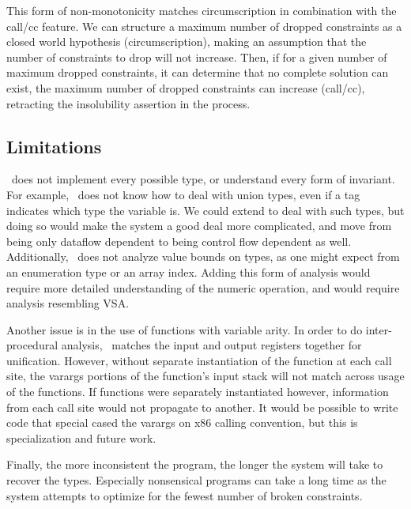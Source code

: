 This form of non-monotonicity matches circumscription in combination with the call/cc feature.
We can structure a maximum number of dropped constraints as a closed world hypothesis (circumscription), making an assumption that the number of constraints to drop will not increase.
Then, if for a given number of maximum dropped constraints, it can determine that no complete solution can exist, the maximum number of dropped constraints can increase (call/cc), retracting the insolubility assertion in the process.

\subsection{Limitations}
\bitr\ does not implement every possible type, or understand every form of invariant. For example, \bitr\ does not know how to deal with union types, even if a tag indicates which type the variable is. We could extend to deal with such types, but doing so would make the system a good deal more complicated, and move from being only dataflow dependent to being control flow dependent as well. Additionally, \bitr\ does not analyze value bounds on types, as one might expect from an enumeration type or an array index. Adding this form of analysis would require more detailed understanding of the numeric operation, and would require analysis resembling VSA\cite{vsa}.

Another issue is in the use of functions with variable arity. In order to do inter-procedural analysis, \bitr\ matches the input and output registers together for unification. However, without separate instantiation of the function at each call site, the varargs portions of the function's input stack will not match across usage of the functions. If functions were separately instantiated however, information from each call site would not propagate to another. It would be possible to write code that special cased the varargs on x86 calling convention, but this is specialization and future work.

Finally, the more inconsistent the program, the longer the system will take to recover the types. Especially nonsensical programs can take a long time as the system attempts to optimize for the fewest number of broken constraints.
